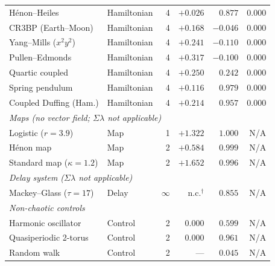 \documentclass[aip,cha,preprint,amsmath,amssymb,floatfix]{revtex4-2}
\begin{document}
\begin{table}[ht]
\begin{tabular}{llr r r r}
H\'{e}non--Heiles        & Hamiltonian & 4 & $+0.026$ & $0.877$ & $0.000$ \\
CR3BP (Earth--Moon)      & Hamiltonian & 4 & $+0.168$ & $-0.046$ & $0.000$ \\
Yang--Mills ($x^2y^2$)   & Hamiltonian & 4 & $+0.241$ & $-0.110$ & $0.000$ \\
Pullen--Edmonds          & Hamiltonian & 4 & $+0.317$ & $-0.100$ & $0.000$ \\
Quartic coupled          & Hamiltonian & 4 & $+0.250$ & $0.242$  & $0.000$ \\
Spring pendulum          & Hamiltonian & 4 & $+0.116$ & $0.979$  & $0.000$ \\
Coupled Duffing (Ham.)   & Hamiltonian & 4 & $+0.214$ & $0.957$  & $0.000$ \\
\midrule
\multicolumn{6}{l}{\textit{Maps (no vector field; $\Sigma\lambda$ not applicable)}} \\
Logistic ($r=3.9$)       & Map & 1 & $+1.322$ & $1.000$ & N/A \\
H\'{e}non map            & Map & 2 & $+0.584$ & $0.999$ & N/A \\
Standard map ($\kappa=1.2$) & Map & 2 & $+1.652$ & $0.996$ & N/A \\
\midrule
\multicolumn{6}{l}{\textit{Delay system ($\Sigma\lambda$ not applicable)}} \\
Mackey--Glass ($\tau=17$) & Delay & $\infty$ & n.c.$^{\dagger}$ & $0.855$ & N/A \\
\midrule
\multicolumn{6}{l}{\textit{Non-chaotic controls}} \\
Harmonic oscillator      & Control & 2 & $0.000$ & $0.599$ & N/A \\
Quasiperiodic 2-torus    & Control & 2 & $0.000$ & $0.961$ & N/A \\
Random walk              & Control & 2 & ---      & $0.045$ & N/A \\
\bottomrule
\end{tabular}
\end{table}
\end{document}
